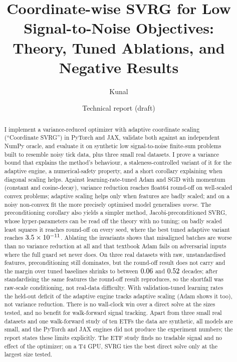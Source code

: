 \documentclass[11pt]{article}
\title{Coordinate-wise SVRG for Low Signal-to-Noise Objectives:\\Theory, Tuned Ablations, and Negative Results}
\author{Kunal}
\date{Technical report (draft)}
\theoremstyle{remark}
\begin{document}
\maketitle

\begin{abstract}
I implement a variance-reduced optimizer with adaptive coordinate scaling (``Coordinate SVRG'') in PyTorch and JAX, validate both against an independent NumPy oracle, and evaluate it on synthetic low signal-to-noise finite-sum problems built to resemble noisy tick data, plus three small real datasets.
I prove a variance bound that explains the method's behaviour, a staleness-controlled variant of it for the adaptive engine, a numerical-safety property, and a short corollary explaining when diagonal scaling helps.
Against learning-rate-tuned Adam and SGD with momentum (constant and cosine-decay), variance reduction reaches float64 round-off on well-scaled convex problems; adaptive scaling helps only when features are badly scaled; and on a noisy non-convex fit the more precisely optimised model generalises \emph{worse}.
The preconditioning corollary also yields a simpler method, Jacobi-preconditioned SVRG, whose hyper-parameters can be read off the theory with no tuning; on badly scaled least squares it reaches round-off on every seed, where the best tuned adaptive variant reaches $3.5\times 10^{-11}$.
Ablating the invariants shows that misaligned batches are worse than no variance reduction at all and that textbook Adam fails on adversarial inputs where the full guard set never does. On three real datasets with raw, unstandardised features, preconditioning still dominates, but the round-off result does not carry and the margin over tuned baselines shrinks to between $0.06$ and $0.52$ decades; after standardising the same features the round-off result reproduces, so the shortfall was raw-scale conditioning, not real-data difficulty. With validation-tuned learning rates the held-out deficit of the adaptive engine tracks adaptive scaling (Adam shows it too), not variance reduction.
There is no wall-clock win over a direct solve at the sizes tested, and no benefit for walk-forward signal tracking.
Apart from three small real datasets and one walk-forward study of ten ETFs the data are synthetic, all models are small, and the PyTorch and JAX engines did not produce the experiment numbers; the report states these limits explicitly. The ETF study finds no tradable signal and no effect of the optimizer; on a T4 GPU, SVRG ties the best direct solve only at the largest size tested.
\end{abstract}
\end{document}
